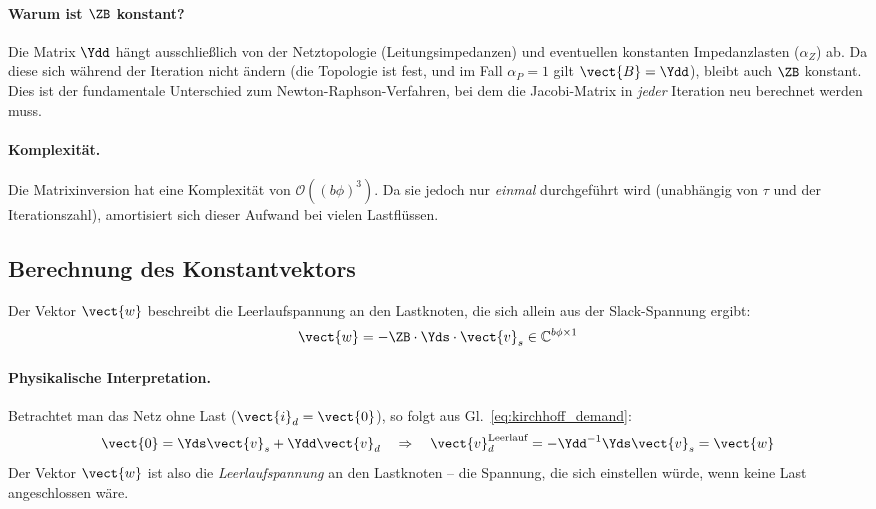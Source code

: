 \paragraph{Warum ist $\ZB$ konstant?} Die Matrix $\Ydd$ hängt ausschließlich von der Netztopologie (Leitungsimpedanzen) und eventuellen konstanten Impedanzlasten ($\alpha_Z$) ab. Da diese sich während der Iteration nicht ändern (die Topologie ist fest, und im Fall $\alpha_P = 1$ gilt $\vect{B} = \Ydd$), bleibt auch $\ZB$ konstant. Dies ist der fundamentale Unterschied zum Newton-Raphson-Verfahren, bei dem die Jacobi-Matrix in \textit{jeder} Iteration neu berechnet werden muss.

\paragraph{Komplexität.} Die Matrixinversion hat eine Komplexität von $\mathcal{O}((b\phi)^3)$. Da sie jedoch nur \textit{einmal} durchgeführt wird (unabhängig von $\tau$ und der Iterationszahl), amortisiert sich dieser Aufwand bei vielen Lastflüssen.

\subsection{Berechnung des Konstantvektors}
\label{subsec:w_berechnung}

Der Vektor $\vect{w}$ beschreibt die Leerlaufspannung an den Lastknoten, die sich allein aus der Slack-Spannung ergibt:
\begin{equation}
	\vect{w} = -\ZB \cdot \Yds \cdot \vect{v}_s \in \mathbb{C}^{b\phi \times 1}
	\label{eq:w_def_impl}
\end{equation}

\paragraph{Physikalische Interpretation.} Betrachtet man das Netz ohne Last ($\vect{i}_d = \vect{0}$), so folgt aus Gl.~\eqref{eq:kirchhoff_demand}:
\begin{equation}
	\vect{0} = \Yds \vect{v}_s + \Ydd \vect{v}_d \quad \Rightarrow \quad \vect{v}_d^{\text{Leerlauf}} = -\Ydd^{-1} \Yds \vect{v}_s = \vect{w}
	\label{eq:leerlaufspannung}
\end{equation}
Der Vektor $\vect{w}$ ist also die \textit{Leerlaufspannung} an den Lastknoten -- die Spannung, die sich einstellen würde, wenn keine Last angeschlossen wäre.

